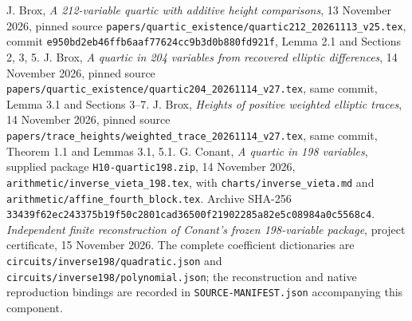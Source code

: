  J. Brox,
\emph{A 212-variable quartic with additive height comparisons},
13 November 2026, pinned source
\nolinkurl{papers/quartic_existence/quartic212_20261113_v25.tex},
commit \nolinkurl{e950bd2eb46ffb6aaf77624cc9b3d0b880fd921f},
Lemma 2.1 and Sections 2, 3, 5.
 J. Brox,
\emph{A quartic in 204 variables from recovered elliptic differences},
14 November 2026, pinned source
\nolinkurl{papers/quartic_existence/quartic204_20261114_v27.tex},
same commit, Lemma 3.1 and Sections 3--7.
 J. Brox,
\emph{Heights of positive weighted elliptic traces},
14 November 2026, pinned source
\nolinkurl{papers/trace_heights/weighted_trace_20261114_v27.tex},
same commit, Theorem 1.1 and Lemmas 3.1, 5.1.
 G. Conant,
\emph{A quartic in 198 variables}, supplied package
\nolinkurl{H10-quartic198.zip}, 14 November 2026,
\nolinkurl{arithmetic/inverse_vieta_198.tex},
with \nolinkurl{charts/inverse_vieta.md} and
\nolinkurl{arithmetic/affine_fourth_block.tex}.
Archive SHA-256
\nolinkurl{33439f62ec243375b19f50c2801cad36500f21902285a82e5c08984a0c5568c4}.
\emph{Independent finite reconstruction of Conant's frozen
198-variable package}, project certificate, 15 November 2026.
The complete coefficient dictionaries are
\nolinkurl{circuits/inverse198/quadratic.json} and
\nolinkurl{circuits/inverse198/polynomial.json};
the reconstruction and native reproduction bindings are recorded in
\nolinkurl{SOURCE-MANIFEST.json} accompanying this component.
